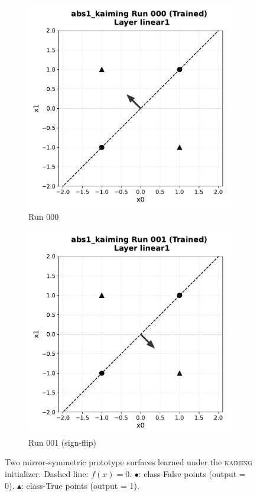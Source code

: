 \begin{figure}[h]
  \centering
  \begin{subfigure}{0.46\textwidth}
    \includegraphics[width=\linewidth]{abs1/figs/kaiming_run000.pdf}
    \caption{Run 000}
  \end{subfigure}\hfill
  \begin{subfigure}{0.46\textwidth}
    \includegraphics[width=\linewidth]{abs1/figs/kaiming_run001.pdf}
    \caption{Run 001 (sign-flip)}
  \end{subfigure}
  \caption{Two mirror-symmetric prototype surfaces learned under the
           \textsc{kaiming} initializer.  
           Dashed line: \(f(x)=0\).  
           \(\bullet\): class-False points (output = 0).  
           \(\blacktriangle\): class-True points (output = 1).}
  \label{fig:abs1-hyperplanes}
\end{figure}

